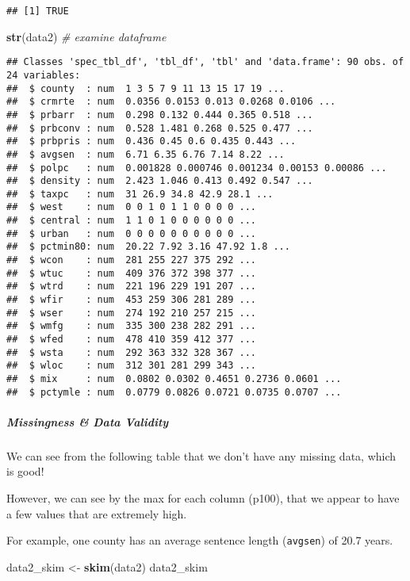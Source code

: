 \documentclass[]{article}
\newenvironment{Shaded}{\begin{snugshade}}{\end{snugshade}}
\newcommand{\CommentTok}[1]{\textcolor[rgb]{0.56,0.35,0.01}{\textit{#1}}}
\newcommand{\KeywordTok}[1]{\textcolor[rgb]{0.13,0.29,0.53}{\textbf{#1}}}
\newcommand{\NormalTok}[1]{#1}
\newcommand{\StringTok}[1]{\textcolor[rgb]{0.31,0.60,0.02}{#1}}
\let\oldsubparagraph\subparagraph
\renewcommand{\subparagraph}[1]{\oldsubparagraph{#1}\mbox{}}
\begin{document}
\begin{verbatim}
## [1] TRUE
\end{verbatim}

\begin{Shaded}
\begin{Highlighting}[]
\KeywordTok{str}\NormalTok{(data2) }\CommentTok{# examine dataframe }
\end{Highlighting}
\end{Shaded}

\begin{verbatim}
## Classes 'spec_tbl_df', 'tbl_df', 'tbl' and 'data.frame': 90 obs. of  24 variables:
##  $ county  : num  1 3 5 7 9 11 13 15 17 19 ...
##  $ crmrte  : num  0.0356 0.0153 0.013 0.0268 0.0106 ...
##  $ prbarr  : num  0.298 0.132 0.444 0.365 0.518 ...
##  $ prbconv : num  0.528 1.481 0.268 0.525 0.477 ...
##  $ prbpris : num  0.436 0.45 0.6 0.435 0.443 ...
##  $ avgsen  : num  6.71 6.35 6.76 7.14 8.22 ...
##  $ polpc   : num  0.001828 0.000746 0.001234 0.00153 0.00086 ...
##  $ density : num  2.423 1.046 0.413 0.492 0.547 ...
##  $ taxpc   : num  31 26.9 34.8 42.9 28.1 ...
##  $ west    : num  0 0 1 0 1 1 0 0 0 0 ...
##  $ central : num  1 1 0 1 0 0 0 0 0 0 ...
##  $ urban   : num  0 0 0 0 0 0 0 0 0 0 ...
##  $ pctmin80: num  20.22 7.92 3.16 47.92 1.8 ...
##  $ wcon    : num  281 255 227 375 292 ...
##  $ wtuc    : num  409 376 372 398 377 ...
##  $ wtrd    : num  221 196 229 191 207 ...
##  $ wfir    : num  453 259 306 281 289 ...
##  $ wser    : num  274 192 210 257 215 ...
##  $ wmfg    : num  335 300 238 282 291 ...
##  $ wfed    : num  478 410 359 412 377 ...
##  $ wsta    : num  292 363 332 328 367 ...
##  $ wloc    : num  312 301 281 299 343 ...
##  $ mix     : num  0.0802 0.0302 0.4651 0.2736 0.0601 ...
##  $ pctymle : num  0.0779 0.0826 0.0721 0.0735 0.0707 ...
\end{verbatim}

\hypertarget{missingness-data-validity}{%
\subparagraph{Missingness \& Data
Validity}\label{missingness-data-validity}}

We can see from the following table that we don't have any missing data,
which is good!

However, we can see by the max for each column (p100), that we appear to
have a few values that are extremely high.

For example, one county has an average sentence length (\texttt{avgsen})
of 20.7 years.

\begin{Shaded}
\begin{Highlighting}[]
\NormalTok{data2_skim <-}\StringTok{ }\KeywordTok{skim}\NormalTok{(data2)}
\NormalTok{data2_skim}
\end{Highlighting}
\end{Shaded}
\end{document}
